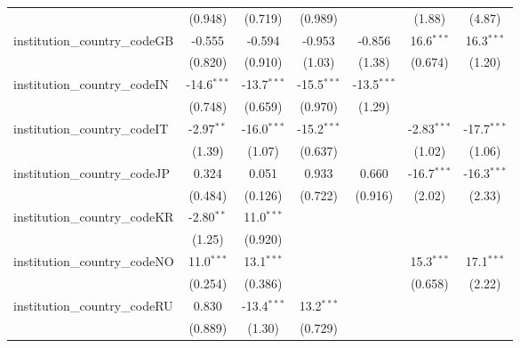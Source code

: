 \begin{tabular}{lcccccc}
                                         & (0.948)       & (0.719)       & (0.989)       &               & (1.88)        & (4.87)\\   
   institution\_country\_codeGB          & -0.555        & -0.594        & -0.953        & -0.856        & 16.6$^{***}$  & 16.3$^{***}$\\   
                                         & (0.820)       & (0.910)       & (1.03)        & (1.38)        & (0.674)       & (1.20)\\   
   institution\_country\_codeIN          & -14.6$^{***}$ & -13.7$^{***}$ & -15.5$^{***}$ & -13.5$^{***}$ &               &   \\   
                                         & (0.748)       & (0.659)       & (0.970)       & (1.29)        &               &   \\   
   institution\_country\_codeIT          & -2.97$^{**}$  & -16.0$^{***}$ & -15.2$^{***}$ &               & -2.83$^{***}$ & -17.7$^{***}$\\   
                                         & (1.39)        & (1.07)        & (0.637)       &               & (1.02)        & (1.06)\\   
   institution\_country\_codeJP          & 0.324         & 0.051         & 0.933         & 0.660         & -16.7$^{***}$ & -16.3$^{***}$\\   
                                         & (0.484)       & (0.126)       & (0.722)       & (0.916)       & (2.02)        & (2.33)\\   
   institution\_country\_codeKR          & -2.80$^{**}$  & 11.0$^{***}$  &               &               &               &   \\   
                                         & (1.25)        & (0.920)       &               &               &               &   \\   
   institution\_country\_codeNO          & 11.0$^{***}$  & 13.1$^{***}$  &               &               & 15.3$^{***}$  & 17.1$^{***}$\\   
                                         & (0.254)       & (0.386)       &               &               & (0.658)       & (2.22)\\   
   institution\_country\_codeRU          & 0.830         & -13.4$^{***}$ & 13.2$^{***}$  &               &               &   \\   
                                         & (0.889)       & (1.30)        & (0.729)       &               &               &   \\   

\end{tabular}
